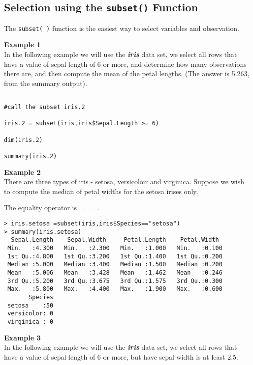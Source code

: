 \documentclass[12pt]{article}
\begin{document}
\subsection*{Selection using the \texttt{subset()} Function}
The \texttt{subset( )} function is the easiest way to select variables and observation. 


\noindent \textbf{Example 1} \\
In the following example we will use the \textit{\textbf{iris}} data set, we select all rows that have a value of sepal length of 6 or more, and determine how many observations there are, and then compute the mean of the petal lengths. (The answer is 5.263, from the summary output).

\begin{framed}
\begin{verbatim}

#call the subset iris.2

iris.2 = subset(iris,iris$Sepal.Length >= 6)

dim(iris.2)

summary(iris.2)

\end{verbatim}
\end{framed}

\newpage
\noindent \textbf{Example 2} \\
There are three types of iris - setosa, versicoloir and virginica. Suppose we wish to compute the median of petal widths for the setosa irises only.

The equality operator is $==$.
\begin{verbatim}
> iris.setosa =subset(iris,iris$Species=="setosa")
> summary(iris.setosa)
  Sepal.Length    Sepal.Width     Petal.Length    Petal.Width   
 Min.   :4.300   Min.   :2.300   Min.   :1.000   Min.   :0.100  
 1st Qu.:4.800   1st Qu.:3.200   1st Qu.:1.400   1st Qu.:0.200  
 Median :5.000   Median :3.400   Median :1.500   Median :0.200  
 Mean   :5.006   Mean   :3.428   Mean   :1.462   Mean   :0.246  
 3rd Qu.:5.200   3rd Qu.:3.675   3rd Qu.:1.575   3rd Qu.:0.300  
 Max.   :5.800   Max.   :4.400   Max.   :1.900   Max.   :0.600  
       Species  
 setosa    :50  
 versicolor: 0  
 virginica : 0 
\end{verbatim} 
 
\noindent \textbf{Example 3} \\
In the following example we will use the \textit{\textbf{iris}} data set, we select all rows that have a value of sepal length of 6 or more, but have sepal width is at least 2.5.
\end{document}
